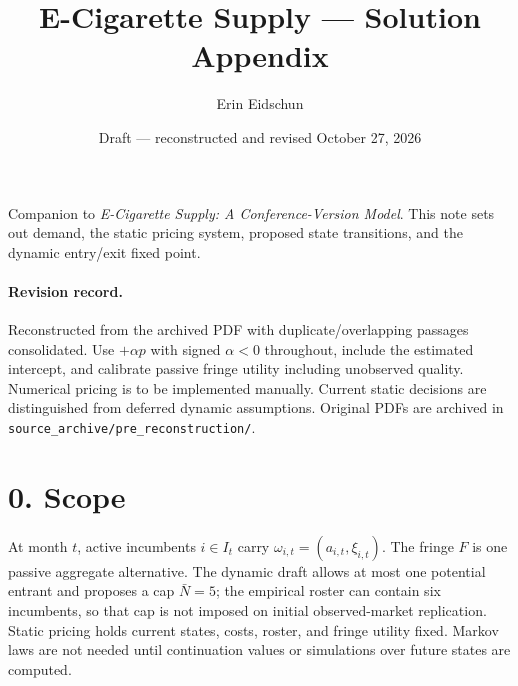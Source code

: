\documentclass[11pt]{article}
\title{E-Cigarette Supply --- Solution Appendix}
\author{Erin Eidschun}
\date{Draft --- reconstructed and revised October 27, 2026}
\begin{document}
\maketitle
Companion to \textit{E-Cigarette Supply: A Conference-Version Model}. This note sets out demand, the static pricing system, proposed state transitions, and the dynamic entry/exit fixed point.
\paragraph{Revision record.} Reconstructed from the archived PDF with duplicate/overlapping passages consolidated. Use $+\alpha p$ with signed $\alpha<0$ throughout, include the estimated intercept, and calibrate passive fringe utility including unobserved quality. Numerical pricing is to be implemented manually. Current static decisions are distinguished from deferred dynamic assumptions. Original PDFs are archived in \texttt{source\_archive/pre\_reconstruction/}.

\section*{0. Scope}
At month $t$, active incumbents $i\in I_t$ carry $\omega_{i,t}=(a_{i,t},\xi_{i,t})$. The fringe $F$ is one passive aggregate alternative. The dynamic draft allows at most one potential entrant and proposes a cap $\bar N=5$; the empirical roster can contain six incumbents, so that cap is not imposed on initial observed-market replication. Static pricing holds current states, costs, roster, and fringe utility fixed. Markov laws are not needed until continuation values or simulations over future states are computed.
\end{document}
